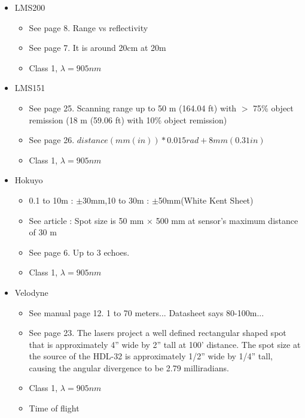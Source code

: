 \begin{itemize}
    \item LMS200
        \begin{itemize}
            \item See page 8. Range vs reflectivity
            \item See page 7. It is around 20cm at 20m
            \item Class 1, $\lambda=905 nm$
        \end{itemize}
    \item LMS151
        \begin{itemize}
            \item See page 25. Scanning range up to 50 m (164.04 ft) with $>$ 75\% object remission (18 m (59.06 ft) with 10\% object remission)
            \item See page 26. $distance(mm (in)) * 0.015 rad + 8 mm (0.31 in)$
            \item Class 1, $\lambda=905 nm$
        \end{itemize}
    \item Hokuyo
        \begin{itemize}
            \item 0.1 to 10m : $\pm$30mm,10 to 30m : $\pm$50mm(White Kent Sheet)
            \item See article : Spot size is 50 mm × 500 mm at sensor’s maximum distance of 30 m
            \item See page 6. Up to 3 echoes.
            \item Class 1, $\lambda=905 nm$
        \end{itemize}
    \item Velodyne
        \begin{itemize}
            \item See manual page 12. 1 to 70 meters... Datasheet says 80-100m...
            \item See page 23. The lasers project a well defined rectangular shaped spot that is approximately 4” wide by 2” tall at 100’ distance. The spot size at the source of the HDL-32 is approximately 1/2” wide by 1/4” tall, causing the angular divergence to be 2.79 milliradians.
            \item Class 1, $\lambda=905 nm$
            \item Time of flight
        \end{itemize}
\end{itemize}

